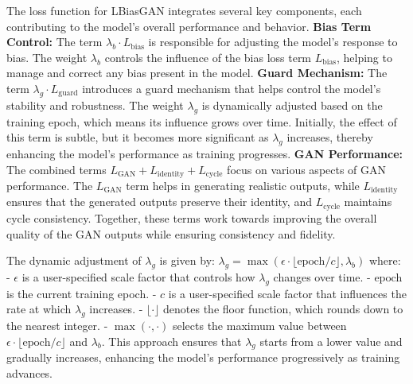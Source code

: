 The loss function for LBiasGAN integrates several key components, each contributing to the model's overall performance and behavior.
\textbf{Bias Term Control:} The term $\lambda_b \cdot L_{\text{bias}}$ is responsible for adjusting the model’s response to bias. The weight $\lambda_b$ controls the influence of the bias loss term $L_{\text{bias}}$, helping to manage and correct any bias present in the model.
\textbf{Guard Mechanism:} The term $\lambda_g \cdot L_{\text{guard}}$ introduces a guard mechanism that helps control the model's stability and robustness. The weight $\lambda_g$ is dynamically adjusted based on the training epoch, which means its influence grows over time. Initially, the effect of this term is subtle, but it becomes more significant as $\lambda_g$ increases, thereby enhancing the model’s performance as training progresses.
\textbf{GAN Performance:} The combined terms $L_{\text{GAN}} + L_{\text{identity}} + L_{\text{cycle}}$ focus on various aspects of GAN performance. The $L_{\text{GAN}}$ term helps in generating realistic outputs, while $L_{\text{identity}}$ ensures that the generated outputs preserve their identity, and $L_{\text{cycle}}$ maintains cycle consistency. Together, these terms work towards improving the overall quality of the GAN outputs while ensuring consistency and fidelity.

The dynamic adjustment of $\lambda_g$ is given by:
$\lambda_g = \max(\epsilon \cdot \lfloor \text{epoch} / c \rfloor, \lambda_b)$
where:
- $\epsilon$ is a user-specified scale factor that controls how $\lambda_g$ changes over time.
- $\text{epoch}$ is the current training epoch.
- $c$ is a user-specified scale factor that influences the rate at which $\lambda_g$ increases.
- $\lfloor \cdot \rfloor$ denotes the floor function, which rounds down to the nearest integer.
- $\max(\cdot, \cdot)$ selects the maximum value between $\epsilon \cdot \lfloor \text{epoch} / c \rfloor$ and $\lambda_b$.
This approach ensures that $\lambda_g$ starts from a lower value and gradually increases, enhancing the model’s performance progressively as training advances.
